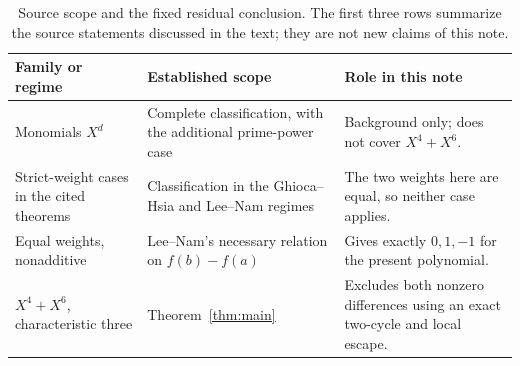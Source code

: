 \begin{table}[tb]
\centering
\small
\begin{tabular}{@{}p{}p{}p{}@{}}
\toprule
Family or regime & Established scope & Role in this note\\
\midrule
Monomials $X^d$ &
Complete classification, with the additional prime-power case &
Background only; does not cover $X^4+X^6$.\\[2pt]
Strict-weight cases in the cited theorems &
Classification in the Ghioca--Hsia and Lee--Nam regimes &
The two weights here are equal, so neither case applies.\\[2pt]
Equal weights, nonadditive &
Lee--Nam's necessary relation on $f(b)-f(a)$ &
Gives exactly $0,1,-1$ for the present polynomial.\\[2pt]
$X^4+X^6$, characteristic three &
Theorem~\ref{thm:main} &
Excludes both nonzero differences using an exact two-cycle and local escape.\\
\bottomrule
\end{tabular}
\caption{Source scope and the fixed residual conclusion. The first three
rows summarize the source statements discussed in the text; they are not
new claims of this note.}
\label{tab:scope}
\end{table}
